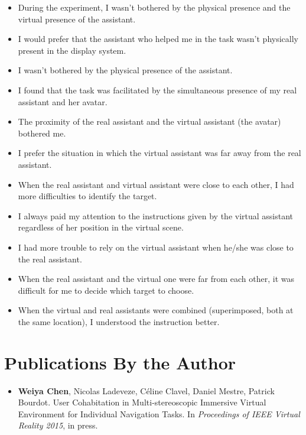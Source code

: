 \begin{appendices}
\begin{itemize}
\item During the experiment, I wasn't bothered by the physical presence and the virtual presence of the assistant.
\item I would prefer that the assistant who helped me in the task wasn't physically present in the display system.
\item I wasn't bothered by the physical presence of the assistant.
\item I found that the task was facilitated by the simultaneous presence of my real assistant and her avatar.
\item The proximity of the real assistant and the virtual assistant (the avatar) bothered me.
\item I prefer the situation in which the virtual assistant was far away from the real assistant.
\item When the real assistant and virtual assistant were close to each other, I had more difficulties to identify the target.
\item I always paid my attention to the instructions given by the virtual assistant regardless of her position in the virtual scene.
\item I had more trouble to rely on the virtual assistant when he/she was close to the real assistant.
\item When the real assistant and the virtual one were far from each other, it was difficult for me to decide which target to choose.
\item When the virtual and real assistants were combined (superimposed, both at the same location), I understood the instruction better.
\end{itemize}


\chapter{Publications By the Author}

\begin{itemize}
\item \textbf{Weiya Chen}, Nicolas Ladeveze, C\'eline Clavel, Daniel Mestre, Patrick Bourdot. User Cohabitation in Multi-stereoscopic Immersive Virtual Environment for Individual Navigation Tasks. In \emph{Proceedings of IEEE Virtual Reality 2015}, in press.
\end{itemize}

\end{appendices}